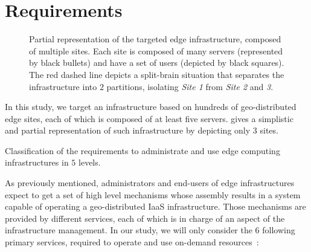 
\section{Requirements}
\label{sec:requirements}

\begin{figure}[t]
  \centering
  \def\svgwidth{\columnwidth}
  
  \caption{Partial representation of the targeted edge infrastructure, composed
    of multiple sites. Each site is composed of many servers (represented by
    black bullets) and have a set of users (depicted by black squares). The red
    dashed line depicts a split-brain situation that separates the
    infrastructure into $2$ partitions, isolating \emph{Site 1} from \emph{Site
    2} and \emph{3}.}
  \label{fig:sites}
\end{figure}

In this study, we target an infrastructure based on hundreds of geo-distributed
edge sites, each of which is composed of at least five servers.
 gives a simplistic and partial representation of such
infrastructure by depicting only $3$ sites.

\begin{table*}
    \centering
        
    \caption{Classification of the requirements to administrate and use edge
    computing infrastructures in $5$ levels.}
    \label{tab:requirements}
\end{table*}

As previously mentioned, administrators and end-users of edge infrastructures
expect to get a set of high level mechanisms whose assembly results in a system
capable of operating a geo-distributed IaaS infrastructure. Those mechanisms
are provided by different services, each of which is in charge of an aspect of
the infrastructure management. In our study, we will only consider the $6$
following primary services, required to operate and use on-demand
resources~\cite{moreno2012csp}:

